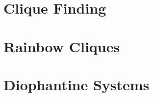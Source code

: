 

\section{Clique Finding}
\label{sec:graphtheory:cliques}






\bigskip


\clearpage

\section{Rainbow Cliques}
\label{sec:graphtheory:rainbow:cliques}






\bigskip


\clearpage


\section{Diophantine Systems}
\label{sec:diophant}




\bigskip


\clearpage

